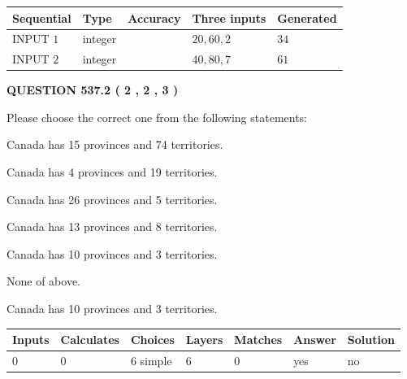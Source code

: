 \documentclass[12pt]{article}
\begin{document}
  
\noindent\begin{tabular}{|l|l|l|l|l|}
\hline
 Sequential & Type & Accuracy & Three inputs & Generated \\ 
\hline
 
 
  INPUT $  1 $ & integer &  & $
 20
 , 
 60
 , 
 2
 $ & $ 34 $ 
 \\  \hline  
 
 
  INPUT $  2 $ & integer &  & $
 40
 , 
 80
 , 
 7
 $ & $ 61 $ 
 \\  \hline  
 \end{tabular}
   
   
  
\vspace{0.2in}
  
{\textbf{\Large{QUESTION
537.2 
 ( 2 , 2 , 3 )
}}}
  
  
Please choose the correct one from the following statements:
 
 
Canada has  15 provinces and  74 territories.
 
 
Canada has   4 provinces and  19 territories.
 
 
Canada has  26 provinces and  5 territories.
 
 
Canada has  13 provinces and  8 territories.
 
 
Canada has 10  provinces and 3 territories.
 
 
 None of above.
 
 
\noindent{}
 
 
Canada has 10  provinces and 3 territories.
 
 
\noindent{}
 
 
   
   
   
   
\noindent\begin{tabular}{|l|l|l|l|l|l|l|}
 \hline
Inputs & Calculates & Choices & Layers & Matches & Answer & Solution \\ \hline
 0  & 
 0  & 
 6
  simple  
  & 
 6  & 
 0  & 
  yes & 
  no 
  \\ \hline
 \end{tabular}
   
\end{document}
